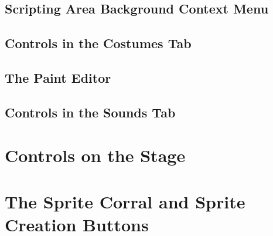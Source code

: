 \documentclass[a4paper]{report}
\begin{document}
\subsection{Scripting Area Background Context Menu}
\subsection{Controls in the Costumes Tab}
\subsection{The Paint Editor}
\subsection{Controls in the Sounds Tab}
\section{Controls on the Stage}
\section{The Sprite Corral and Sprite Creation Buttons}
\end{document}
